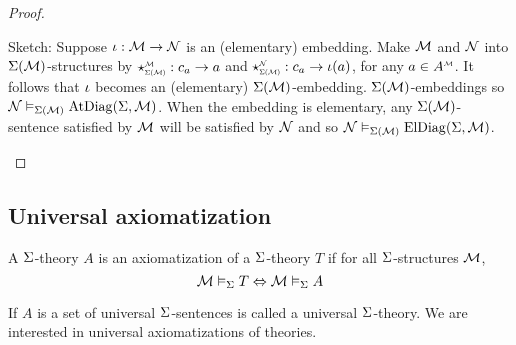 \begin{proof}
    \begin{backward}
        Sketch: Suppose $\iota : \mathcal{M} \to \mathcal{N}$ is an (elementary) embedding.
        Make $\mathcal{M}$ and $\mathcal{N}$ into $\Sigma(\mathcal{M})$-structures by 
        $\intp{\Si(\MM)}{\MM}: c_a \to a$ and 
        $\intp{\Si(\MM)}{\NN}: c_a \to \io(a)$,
        for any $a \in \mmintp{A}$.
        It follows that $\iota$ becomes an (elementary) $\Sigma(\mathcal{M})$-embedding.
        $\Sigma(\mathcal{M})$-embeddings  so 
            $\mathcal{N} \vDash_{\Sigma(\mathcal{M})} \mathrm{AtDiag}(\Sigma,\mathcal{M})$.
        When the embedding is elementary,
        any $\Sigma(\mathcal{M})$-sentence satisfied by $\mathcal{M}$ will be satisfied by $\mathcal{N}$ 
        and so $\mathcal{N} \vDash_{\Sigma(\mathcal{M})} \mathrm{ElDiag}(\Sigma,\mathcal{M})$.
    \end{backward}
\end{proof}

\subsection{Universal axiomatization}
\begin{dfn}
    A $\Sigma$-theory $A$ is an axiomatization of a 
    $\Sigma$-theory $T$ if for all $\Sigma$-structures $\mathcal{M}$,
    \[\mathcal{M} \vDash_{\Sigma} T \Leftrightarrow \mathcal{M} \vDash_{\Sigma} A\]

    If $A$ is a set of universal $\Sigma$-sentences 
    is called a universal $\Sigma$-theory.
    We are interested in universal axiomatizations of theories.
\end{dfn}

